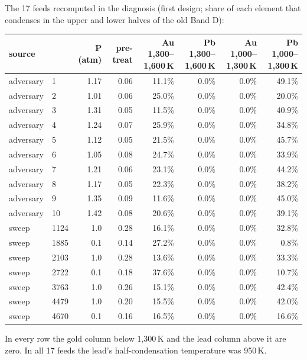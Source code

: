\documentclass[11pt,a4paper]{article}
\begin{document}
\noindent The 17 feeds recomputed in the diagnosis (first design; share of each element that condenses in the upper and lower halves of the old Band D):
\begin{center}
\footnotesize
\begin{tabular}{@{}llrrrrrr@{}}
\toprule
\textbf{source} & & \textbf{P (atm)} & \textbf{pre-treat} & \textbf{Au 1,300--1,600\,K} & \textbf{Pb 1,300--1,600\,K} & \textbf{Au 1,000--1,300\,K} & \textbf{Pb 1,000--1,300\,K} \\
\midrule
adversary & 1 & 1.17 & 0.06 & 11.1\% & 0.0\% & 0.0\% & 49.1\% \\
adversary & 2 & 1.01 & 0.06 & 25.0\% & 0.0\% & 0.0\% & 20.0\% \\
adversary & 3 & 1.31 & 0.05 & 11.5\% & 0.0\% & 0.0\% & 40.9\% \\
adversary & 4 & 1.24 & 0.07 & 25.9\% & 0.0\% & 0.0\% & 34.8\% \\
adversary & 5 & 1.12 & 0.05 & 21.5\% & 0.0\% & 0.0\% & 45.7\% \\
adversary & 6 & 1.05 & 0.08 & 24.7\% & 0.0\% & 0.0\% & 33.9\% \\
adversary & 7 & 1.21 & 0.06 & 23.1\% & 0.0\% & 0.0\% & 44.2\% \\
adversary & 8 & 1.17 & 0.05 & 22.3\% & 0.0\% & 0.0\% & 38.2\% \\
adversary & 9 & 1.35 & 0.09 & 11.6\% & 0.0\% & 0.0\% & 45.0\% \\
adversary & 10 & 1.42 & 0.08 & 20.6\% & 0.0\% & 0.0\% & 39.1\% \\
sweep & 1124 & 1.0 & 0.28 & 16.1\% & 0.0\% & 0.0\% & 32.8\% \\
sweep & 1885 & 0.1 & 0.14 & 27.2\% & 0.0\% & 0.0\% & 0.8\% \\
sweep & 2103 & 1.0 & 0.28 & 13.6\% & 0.0\% & 0.0\% & 33.3\% \\
sweep & 2722 & 0.1 & 0.18 & 37.6\% & 0.0\% & 0.0\% & 10.7\% \\
sweep & 3763 & 1.0 & 0.26 & 15.1\% & 0.0\% & 0.0\% & 42.4\% \\
sweep & 4479 & 1.0 & 0.20 & 15.5\% & 0.0\% & 0.0\% & 42.0\% \\
sweep & 4670 & 0.1 & 0.16 & 16.5\% & 0.0\% & 0.0\% & 16.6\% \\
\bottomrule
\end{tabular}
\end{center}
In every row the gold column below 1,300\,K and the lead column above it are zero. In all 17 feeds the lead's half-condensation temperature was 950\,K.
\end{document}
